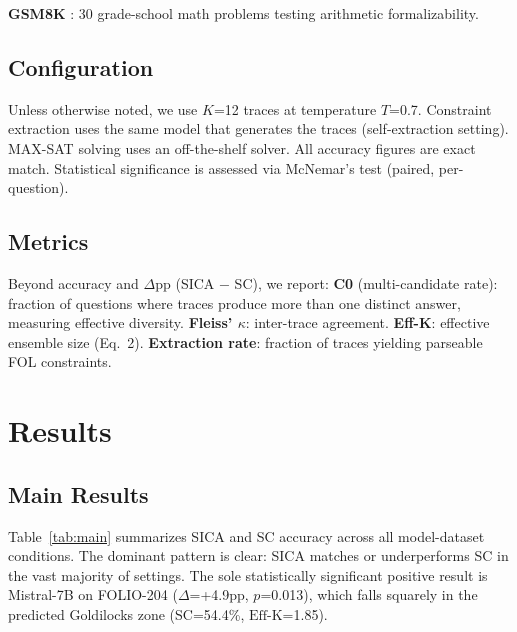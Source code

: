 \documentclass[11pt,a4paper]{article}
\newcommand{\effk}{\text{Eff-K}}
\begin{document}
\textbf{GSM8K} \cite{cobbe2021gsm8k}: 30 grade-school math problems testing arithmetic formalizability.

\subsection{Configuration}

Unless otherwise noted, we use $K$=12 traces at temperature $T$=0.7. Constraint extraction uses the same model that generates the traces (self-extraction setting). MAX-SAT solving uses an off-the-shelf solver. All accuracy figures are exact match. Statistical significance is assessed via McNemar's test (paired, per-question).

\subsection{Metrics}

Beyond accuracy and $\Delta$pp (SICA $-$ SC), we report: \textbf{C0} (multi-candidate rate): fraction of questions where traces produce more than one distinct answer, measuring effective diversity. \textbf{Fleiss' $\kappa$}: inter-trace agreement. \textbf{Eff-K}: effective ensemble size (Eq.~2). \textbf{Extraction rate}: fraction of traces yielding parseable FOL constraints.

\section{Results}

\subsection{Main Results}

Table~\ref{tab:main} summarizes SICA and SC accuracy across all model-dataset conditions. The dominant pattern is clear: SICA matches or underperforms SC in the vast majority of settings. The sole statistically significant positive result is Mistral-7B on FOLIO-204 ($\Delta$=+4.9pp, $p$=0.013), which falls squarely in the predicted Goldilocks zone (SC=54.4\%, $\effk$=1.85).
\end{document}

